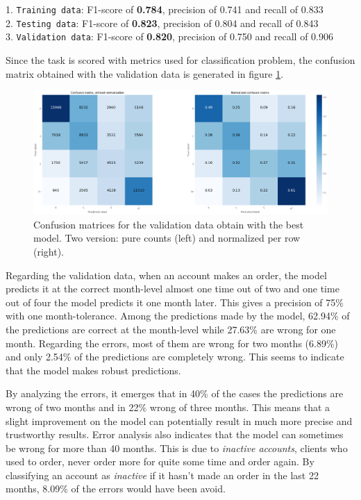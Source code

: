 \noindent\hspace*{0.8cm}  1. \texttt{Training data}:   F1-score of \textbf{0.784}, precision of 0.741 and recall of 0.833 \\
\hspace*{0.8cm}           2. \texttt{Testing data}:    F1-score of \textbf{0.823}, precision of 0.804 and recall of 0.843 \\
\hspace*{0.8cm}           3. \texttt{Validation data}: F1-score of \textbf{0.820}, precision of 0.750 and recall of 0.906

Since the task is scored with metrics used for classification problem, the confusion matrix obtained with the validation data is generated in figure \ref{fig:cf-matrix-validation}.

\begin{figure}[htbp]
    \centering
    \includegraphics[width=15cm]{images/cf-matrix-validation_complete.png}
    \caption[Confusion matrices for validation data]{Confusion matrices for the validation data obtain with the best model. Two version: pure counts (left) and normalized per row (right).}
    \label{fig:cf-matrix-validation}
\end{figure}

Regarding the validation data, when an account makes an order, the model predicts it at the correct month-level almost one time out of two and one time out of four the model predicts it one month later. This gives a precision of 75\% with one month-tolerance. Among the predictions made by the model, 62.94\% of the predictions are correct at the month-level while 27.63\% are wrong for one month. Regarding the errors, most of them are wrong for two months (6.89\%) and only 2.54\% of the predictions are completely wrong. This seems to indicate that the model makes robust predictions.

By analyzing the errors, it emerges that in 40\% of the cases the predictions are wrong of two months and in 22\% wrong of three months. This means that a slight improvement on the model can potentially result in much more precise and trustworthy results. Error analysis also indicates that the model can sometimes be wrong for more than 40 months. This is due to \textit{inactive accounts}, clients who used to order, never order more for quite some time and order again. By classifying an account as \textit{inactive} if it hasn't made an order in the last 22 months, 8.09\% of the errors would have been avoid.

